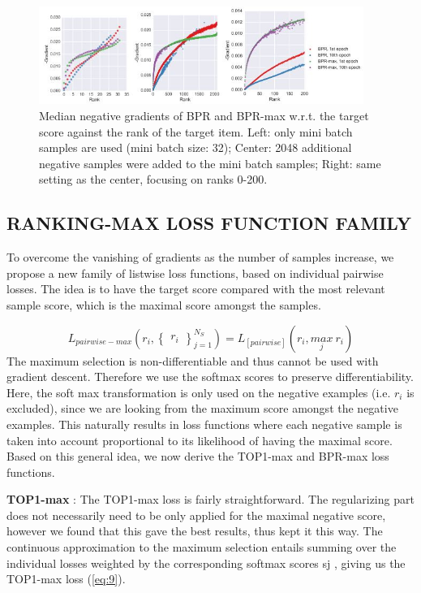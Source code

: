 \documentclass{article} %
\begin{document}
\graphicspath{{img/}}

\begin{figure}[htp]
    \centering
    \includegraphics[width=400]{p2}
    \caption{Median negative gradients of BPR and BPR-max w.r.t. the target score against the rank of the target item. Left: only mini batch samples are used (mini batch size: 32); Center: 2048 additional negative samples were added to the mini batch samples; Right: same setting as the center, focusing on ranks 0-200.}
    \label{fig:galaxy}
\end{figure}

\subsection{ RANKING-MAX LOSS FUNCTION FAMILY}
To overcome the vanishing of gradients as the number of samples increase, we propose a new family of listwise loss functions, based on individual pairwise losses. The idea is to have the target score compared with the most relevant sample score, which is the maximal score amongst the samples.

\begin{equation}\label{eq:8}
    L_{pairwise-max}\left ( r_i,\begin{Bmatrix}
r_i
\end{Bmatrix}_{j=1}^{N_S} \right ) = L_[pairwise]\left ( r_i,  \underset{j}{max} \ r_i\right )
\end{equation}
The maximum selection is non-differentiable and thus cannot be used with gradient descent. Therefore we use the softmax scores to preserve differentiability. Here, the soft max transformation is
only used on the negative examples (i.e. $r_i$ is excluded), since we are looking from the maximum score amongst the negative examples. This naturally results in loss functions where each negative sample is taken into account proportional to its likelihood of having the maximal score. Based on this general idea, we now derive the TOP1-max and BPR-max loss functions.

\textbf{TOP1-max} : The TOP1-max loss is fairly straightforward. The regularizing part does not necessarily need to be only applied for the maximal negative score, however we found that this gave the
best results, thus kept it this way. The continuous approximation to the maximum selection entails
summing over the individual losses weighted by the corresponding softmax scores sj , giving us the
TOP1-max loss (\ref{eq:9}).
\end{document}
